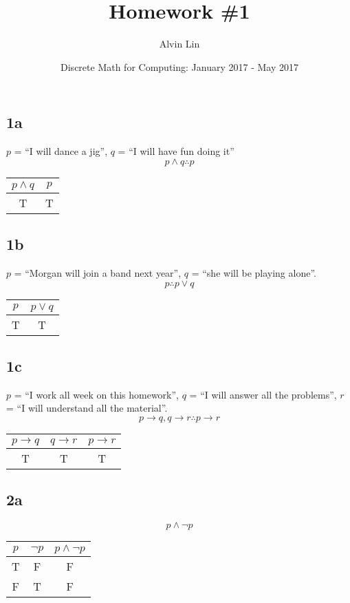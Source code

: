 \documentclass[letterpaper, 12pt]{math}
\title{Homework \#1}
\author{Alvin Lin}
\date{Discrete Math for Computing: January 2017 - May 2017}
\begin{document}
\maketitle

\subsection*{1a}
\( p \) = ``I will dance a jig'', \( q \) = ``I will have fun doing it''
\[ p \wedge q \therefore p \]
\begin{center}
  \begin{tabular}{|c|c|}
    \hline
    \( p \wedge q \) & \( p \) \\ \hline
    T                & T       \\ \hline
  \end{tabular}
\end{center}

\subsection*{1b}
\( p \) = ``Morgan will join a band next year'', \( q \) = ``she will be
playing alone''.
\[ p \therefore p \vee q \]
\begin{center}
  \begin{tabular}{|c|c|}
    \hline
    \( p \) & \( p \vee q \) \\ \hline
    T       & T              \\ \hline
  \end{tabular}
\end{center}

\subsection*{1c}
\( p \) = ``I work all week on this homework'', \( q \) = ``I will answer all
the problems'', \( r \) = ``I will understand all the material''.
\[ p \to q, q \to r \therefore p \to r \]
\begin{center}
  \begin{tabular}{|c|c|c|}
    \hline
    \( p \to q \) & \( q \to r \) & \( p \to r \) \\ \hline
    T             & T              & T            \\ \hline
  \end{tabular}
\end{center}

\subsection*{2a}
\[ p \wedge \neg{p} \]
\begin{center}
  \begin{tabular}{|c|c|c|}
    \hline
    \( p \) & \( \neg{p} \) & \( p \wedge \neg{p} \) \\ \hline
    T       & F             & F                      \\ \hline
    F       & T             & F                      \\ \hline
  \end{tabular}
\end{center}
\end{document}

